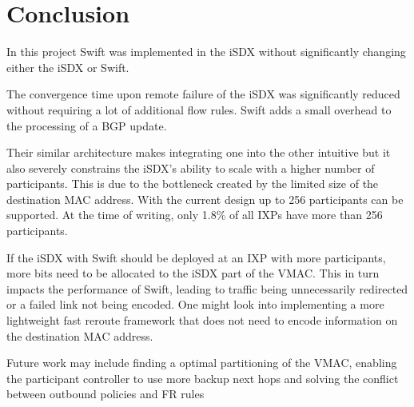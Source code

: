 \chapter{\label{chapter7}Conclusion}
In this project Swift was implemented in the iSDX without significantly changing either the iSDX or Swift.

The convergence time upon remote failure of the iSDX was significantly reduced without requiring a lot of additional flow rules. Swift adds a small overhead to the processing of a BGP update. 

Their similar architecture makes integrating one into the other intuitive but it also severely constrains the iSDX's ability to scale with a higher number of participants. This is due to the bottleneck created by the limited size of the destination MAC address. With the current design up to 256 participants can be supported. At the time of writing, only 1.8\% of all IXPs have more than 256 participants. \cite{ixps} 

If the iSDX with Swift should be deployed at an IXP with more participants, more bits need to be allocated to the iSDX part of the VMAC. This in turn impacts the performance of Swift, leading to traffic being unnecessarily redirected or a failed link not being encoded. One might look into implementing a more lightweight fast reroute framework that does not need to encode information on the destination MAC address. 

Future work may include finding a optimal partitioning of the VMAC, enabling the participant controller to use more backup next hops and solving the conflict between outbound policies and FR rules